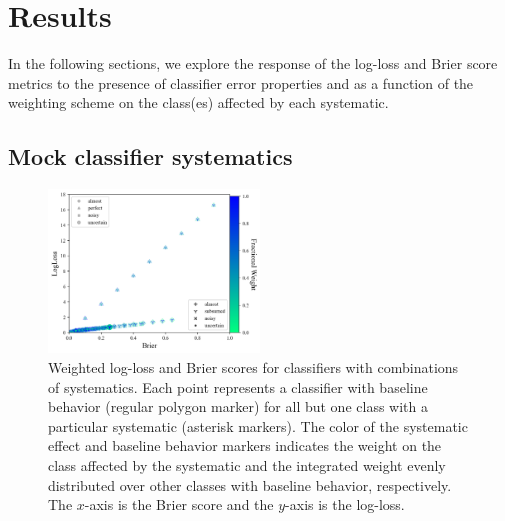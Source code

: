 \section{Results}
\label{sec:results}

In the following sections, we explore the response of the log-loss and Brier score metrics to the presence of classifier error properties and as a function of the weighting scheme on the class(es) affected by each systematic.

\subsection{Mock classifier systematics}
\label{sec:mockresults}

\begin{figure}
	\begin{center}
		\includegraphics[width=0.5\textwidth]{./fig/test_combo.png}
		\caption{Weighted log-loss and Brier scores for classifiers with combinations of systematics.
		Each point represents a classifier with baseline behavior (regular polygon marker) for all but one class with a particular systematic (asterisk markers).
		The color of the systematic effect and baseline behavior markers indicates the weight on the class affected by the systematic and the integrated weight evenly distributed over other classes with baseline behavior, respectively.
		The $x$-axis is the Brier score and the $y$-axis is the log-loss.
		}
	\end{center}
	\label{fig:all_combined}
\end{figure}

